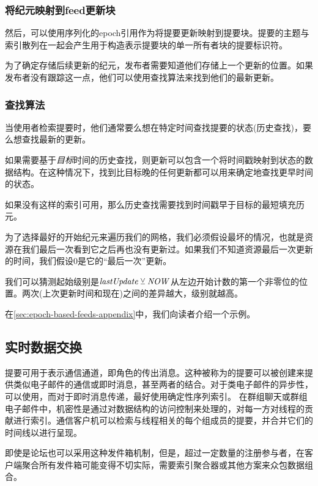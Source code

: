 \subsubsection{将纪元映射到feed更新块}

然后，可以使用序列化的epoch引用作为将提要更新映射到提要块。提要的主题与索引散列在一起会产生用于构造表示提要块的单一所有者块的提要标识符。

为了确定存储后续更新的纪元，发布者需要知道他们存储上一个更新的位置。如果发布者没有跟踪这一点，他们可以使用查找算法来找到他们的最新更新。



\subsubsection{查找算法}

当使用者检索提要时，他们通常要么想在特定时间查找提要的状态(历史查找)，要么想查找最新的更新。

如果需要基于\emph{目标}时间的历史查找，则更新可以包含一个将时间戳映射到状态的数据结构。在这种情况下，找到比目标晚的任何更新都可以用来确定地查找更早时间的状态。

如果没有这样的索引可用，那么历史查找需要找到时间戳早于目标的最短填充历元。

为了选择最好的开始纪元来遍历我们的网格，我们必须假设最坏的情况，也就是资源在我们最后一次看到它之后再也没有更新过。如果我们不知道资源最后一次更新的时间，我们假设0是它的“最后一次”更新。

我们可以猜测起始级别是$\mathit{lastUpdate}\veebar \mathit{NOW}$从左边开始计数的第一个非零位的位置。两次(上次更新时间和现在)之间的差异越大，级别就越高。

在\ref{sec:epoch-based-feeds-appendix}中，我们向读者介绍一个示例。

\subsection{实时数据交换}\label{sec:feed-as-channel}

提要可用于表示通信通道，即角色的传出消息。这种被称为的提要可以被创建来提供类似电子邮件的通信或即时消息，甚至两者的结合。对于类电子邮件的异步性，可以使用，而对于即时消息传递，最好使用确定性序列索引。
在群组聊天或群组电子邮件中，机密性是通过对数据结构的访问控制来处理的，对每一方对线程的贡献进行索引。通信客户机可以检索与线程相关的每个组成员的提要，并合并它们的时间线以进行呈现。

即使是论坛也可以采用这种发件箱机制，但是，超过一定数量的注册参与者，在客户端聚合所有发件箱可能变得不切实际，需要索引聚合器或其他方案来众包数据组合。

